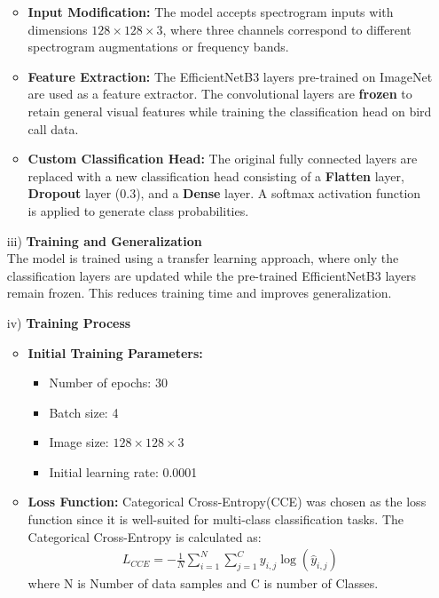 \begin{itemize}
            \begin{itemize}
            \item \textbf{Input Modification:} The model accepts spectrogram inputs with dimensions \(128 \times 128 \times 3\), where three channels correspond to different spectrogram augmentations or frequency bands.
            \item \textbf{Feature Extraction:} The EfficientNetB3 layers pre-trained on ImageNet are used as a feature extractor. The convolutional layers are \textbf{frozen} to retain general visual features while training the classification head on bird call data.
            \item \textbf{Custom Classification Head:} The original fully connected layers are replaced with a new classification head consisting of a \textbf{Flatten} layer, \textbf{Dropout} layer (0.3), and a \textbf{Dense} layer. A softmax activation function is applied to generate class probabilities.
            \end{itemize}
            

            \item[iii)] \textbf{Training and Generalization} \\
            The model is trained using a transfer learning approach, where only the classification layers are updated while the pre-trained EfficientNetB3 layers remain frozen. This reduces training time and improves generalization.
            

            \item[iv)] \textbf{Training Process} 
            \begin{itemize}
                  \item \textbf{Initial Training Parameters:}
                  \begin{itemize}
                  \item Number of epochs: 30
                  \item Batch size: 4
                  \item Image size: \(128 \times 128 \times 3\)
                  \item Initial learning rate: 0.0001
                  \end{itemize}
            
                  \item \textbf{Loss Function:}
                  Categorical Cross-Entropy(CCE) was chosen as the loss function since it is well-suited for multi-class classification tasks. The Categorical Cross-Entropy is calculated as:
                  \begin{eqnarray}
                        L_{CCE} = -\frac{1}{N} \sum_{i=1}^{N} \sum_{j=1}^{C} y_{i,j} \log(\hat{y}_{i,j})
                  \end{eqnarray}
                        where N is Number of data samples and C is number of Classes.
                  

\end{itemize}
\end{itemize}
